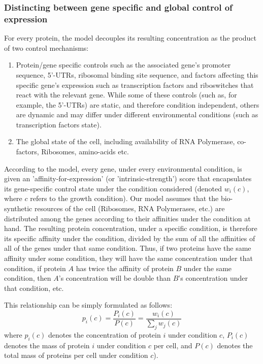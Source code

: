 \documentclass[notitlepage]{article}
\begin{document}
\subsubsection{Distincting between gene specific and global control of expression}
For every protein, the model decouples its resulting concentration as the product of two control mechanisms:
\begin{enumerate}
\item Protein/gene specific controls such as the associated gene's promoter sequence, 5'-UTRs, ribosomal binding site sequence, and factors affecting this specific gene's expression such as transcription factors and riboswitches that react with the relevant gene.
  While some of these controls (such as, for example, the 5'-UTRs) are static, and therefore condition independent, others are dynamic and may differ under different environmental conditions (such as transcription factors state).
\item The global state of the cell, including availability of RNA Polymerase, co-factors, Ribosomes, amino-acids etc.
\end{enumerate}
According to the model, every gene, under every environmental condition, is given an 'affinity-for-expression' (or 'intrinsic-strength') score that encapsulates its gene-specific control state under the condition considered (denoted $w_i(c)$, where $c$ refers to the growth condition).
Our model assumes that the bio-synthetic resources of the cell (Ribosomes, RNA Polymerases, etc.) are distributed among the genes according to their affinities under the condition at hand.
The resulting protein concentration, under a specific condition, is therefore its specific affinity under the condition, divided by the sum of all the affinities of all of the genes under that same condition.
Thus, if two proteins have the same affinity under some condition, they will have the same concentration under that condition, if protein $A$ has twice the affinity of protein $B$ under the same condition, then $A$'s concentration will be double than $B$'s concentration under that condition, etc.

This relationship can be simply formulated as follows:
\begin{equation}
  \label{eq:concentration-ratio}
  p_i(c)=\frac{P_i(c)}{P(c)}=\frac{w_i(c)}{\sum_jw_j(c)}
\end{equation}
where $p_i(c)$ denotes the concentration of protein $i$ under condition $c$, $P_i(c)$ denotes the mass of protein $i$ under condition $c$ per cell, and $P(c)$ denotes the total mass of proteins per cell under condition $c$).
\end{document}

